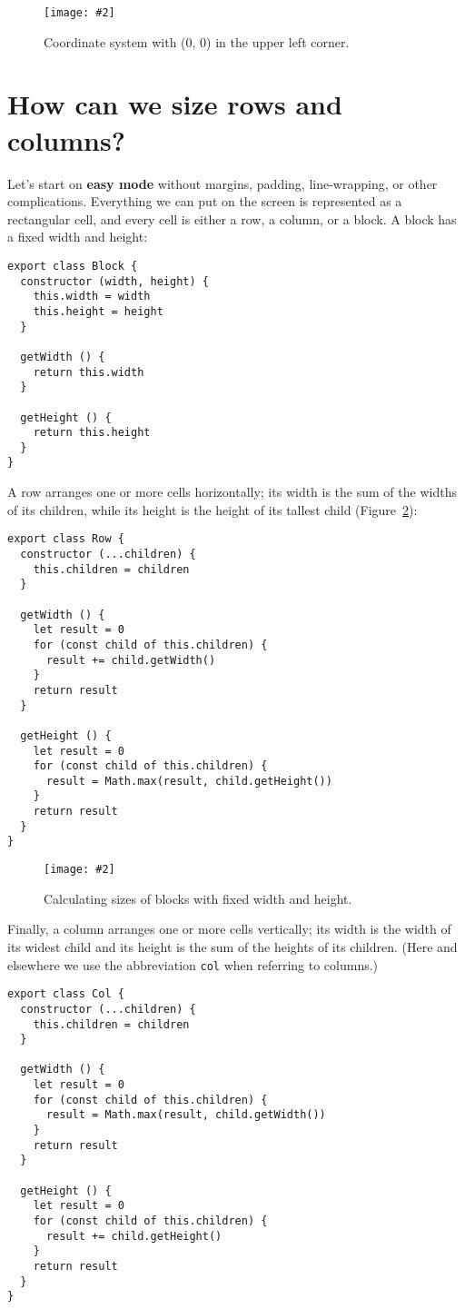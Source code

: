 \documentclass[krantzl]{krantz}
\newcommand{\figpdf}[4]{\begin{figure}%
\centering%
\texttt{[image: \#2]}%
\caption{#3}%
\label{#1}%
\end{figure}}
\newcommand{\figref}[1]{Figure~\ref{#1}}
\newcommand{\glossref}[1]{\textbf{#1}}
\begin{document}
\figpdf{layout-engine-coordinate-system}{./layout-engine/coordinate-system.pdf}{Coordinate system with (0, 0) in the upper left corner.}{0.6}

\section{How can we size rows and columns?}\label{layout-engine-size}


Let's start on \glossref{easy mode}
without margins, padding, line-wrapping, or other complications.
Everything we can put on the screen is represented as a rectangular cell,
and every cell is either a row, a column, or a block.
A block has a fixed width and height:


\begin{lstlisting}[frame=single,frameround=tttt]
export class Block {
  constructor (width, height) {
    this.width = width
    this.height = height
  }

  getWidth () {
    return this.width
  }

  getHeight () {
    return this.height
  }
}
\end{lstlisting}



A row arranges one or more cells horizontally;
its width is the sum of the widths of its children,
while its height is the height of its tallest child
(\figref{layout-engine-sizing}):


\begin{lstlisting}[frame=single,frameround=tttt]
export class Row {
  constructor (...children) {
    this.children = children
  }

  getWidth () {
    let result = 0
    for (const child of this.children) {
      result += child.getWidth()
    }
    return result
  }

  getHeight () {
    let result = 0
    for (const child of this.children) {
      result = Math.max(result, child.getHeight())
    }
    return result
  }
}
\end{lstlisting}


\figpdf{layout-engine-sizing}{./layout-engine/sizing.pdf}{Calculating sizes of blocks with fixed width and height.}{0.6}


Finally,
a column arranges one or more cells vertically;
its width is the width of its widest child
and its height is the sum of the heights of its children.
(Here and elsewhere we use the abbreviation \texttt{col} when referring to columns.)


\begin{lstlisting}[frame=single,frameround=tttt]
export class Col {
  constructor (...children) {
    this.children = children
  }

  getWidth () {
    let result = 0
    for (const child of this.children) {
      result = Math.max(result, child.getWidth())
    }
    return result
  }

  getHeight () {
    let result = 0
    for (const child of this.children) {
      result += child.getHeight()
    }
    return result
  }
}
\end{lstlisting}
\end{document}
